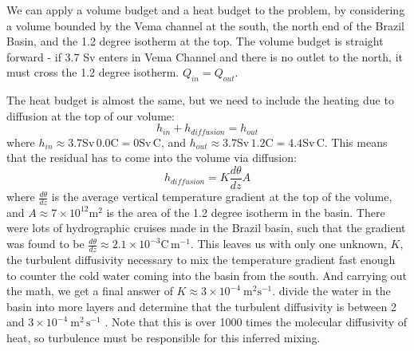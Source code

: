 We can apply a volume budget and a heat budget to the problem, by considering a volume bounded by the Vema channel at the south, the north end of the Brazil Basin, and the 1.2 degree isotherm at the top.  The volume budget is straight forward - if 3.7 Sv enters in Vema Channel and there is no outlet to the north, it must cross the 1.2 degree isotherm.  $Q_{in} = Q_{out}$.  

The heat budget is almost the same, but we need to include the heating due to diffusion at the top of our volume:
\begin{equation}
    h_{in} + h_{diffusion}= h_{out}
\end{equation}
where $h_{in} \approx  3.7 \mathrm{Sv}\, 0.0 \mathrm{C} = 0 \mathrm{Sv\,C}$, and $h_{out} \approx 3.7 \mathrm{Sv}\, 1.2 \mathrm{C} = 4.4 \mathrm{Sv\,C}$.  This means that the residual has to come into the volume via diffusion:
\begin{equation}
    h_{diffusion} = K \frac{d\theta}{dz} A    
\end{equation}
where $\frac{d\theta}{dz}$ is the average vertical temperature gradient at the top of the volume, and $A\approx 7\times10^{12}\mathrm{m^2}$ is the area of the 1.2 degree isotherm in the basin.  There were lots of hydrographic cruises made in the Brazil basin, such that the gradient was found to be 
$\frac{d\theta}{dz}\approx 2.1\times10^{-3}\mathrm{C\,m^{-1}}$. This leaves us with only one unknown, $K$, the turbulent diffusivity necessary to mix the temperature gradient fast enough to counter the cold water coming into the basin from the south.  And carrying out the math, we get a final answer of $K\approx 3\times10^{-4}\ \mathrm{m^2s^{-1}}$.   \citet{morrisetal01} divide the water in the basin into more layers and determine that the turbulent diffusivity is between 2 and $3\times 10 ^{-4}\ \mathrm{m^2\,s^{-1}}$ .  Note that this is over 1000 times the molecular diffusivity of heat, so turbulence must be responsible for this inferred mixing.  

